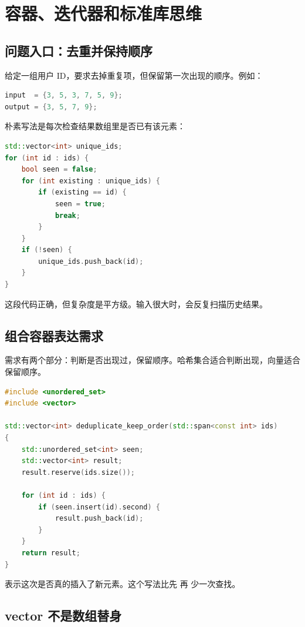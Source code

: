 \chapter{容器、迭代器和标准库思维}

\section{问题入口：去重并保持顺序}

给定一组用户 ID，要求去掉重复项，但保留第一次出现的顺序。例如：

\begin{lstlisting}[language=C++,caption={输入输出示例}]
input  = {3, 5, 3, 7, 5, 9};
output = {3, 5, 7, 9};
\end{lstlisting}

朴素写法是每次检查结果数组里是否已有该元素：

\begin{lstlisting}[language=C++,caption={朴素去重}]
std::vector<int> unique_ids;
for (int id : ids) {
    bool seen = false;
    for (int existing : unique_ids) {
        if (existing == id) {
            seen = true;
            break;
        }
    }
    if (!seen) {
        unique_ids.push_back(id);
    }
}
\end{lstlisting}

这段代码正确，但复杂度是平方级。输入很大时，会反复扫描历史结果。

\section{组合容器表达需求}

需求有两个部分：判断是否出现过，保留顺序。哈希集合适合判断出现，向量适合保留顺序。

\begin{lstlisting}[language=C++,caption={哈希集合加顺序数组}]
#include <unordered_set>
#include <vector>

std::vector<int> deduplicate_keep_order(std::span<const int> ids)
{
    std::unordered_set<int> seen;
    std::vector<int> result;
    result.reserve(ids.size());

    for (int id : ids) {
        if (seen.insert(id).second) {
            result.push_back(id);
        }
    }
    return result;
}
\end{lstlisting}

 表示这次是否真的插入了新元素。这个写法比先  再  少一次查找。

\section{vector 不是数组替身}

